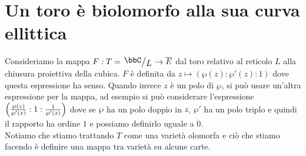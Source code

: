 \section{Un toro è biolomorfo alla sua curva ellittica}

Consideriamo la mappa $F: T = \quotient{\bbC}{L} \rar \ol{E}$ dal toro relativo al reticolo $L$ alla chiusura proiettiva della cubica. $F$ è definita da $z \mapsto (\wp(z) : \wp'(z) : 1)$ dove questa espressione ha senso. Quando invece $z$ è un polo di $\wp$, si può usare un'altra espressione per la mappa, ad esempio si può considerare l'espressione $\left({\frac{\wp(z)}{\wp'(z)} : 1 : \frac{1}{\wp'(z)}}\right)$ dove se $\wp$ ha un polo doppio in $z$, $\wp'$ ha un polo triplo e quindi il rapporto ha ordine $1$ e possiamo definirlo uguale a $0$.\\
Notiamo che stiamo trattando $T$ come una varietà olomorfa e ciò che stiamo facendo è definire una mappa tra varietà su alcune carte.


